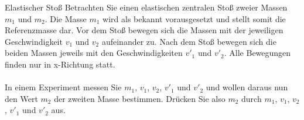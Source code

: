 \setcounter{punkte}{3}
\begin{aufgabe}{Elastischer Stoß}
Betrachten Sie einen elastischen zentralen Stoß zweier Massen $m_1$ und $m_2$.
Die Masse $m_1$ wird als bekannt vorausgesetzt und stellt somit die Referenzmasse dar.
Vor dem Stoß bewegen sich die Massen mit der jeweiligen Geschwindigkeit
$v_1$ und $v_2$ aufeinander zu. Nach dem Stoß bewegen sich die beiden Massen jeweils mit
den Geschwindigkeiten $v'_1$ und $v'_2$. Alle Bewegungen finden nur in x-Richtung statt.\\\\
In einem Experiment messen Sie $m_1$, $v_1$, $v_2$, $v'_1$ und $v'_2$ und
wollen daraus nun den Wert $m_2$ der zweiten Masse bestimmen.
Drücken Sie also $m_2$ durch $m_1$, $v_1$, $v_2$, $v'_1$ und $v'_2$ aus.
\end{aufgabe}

%
%
